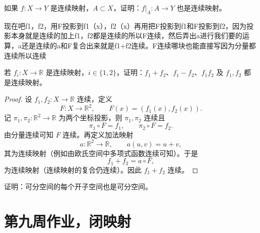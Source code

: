 \begin{homework}[14]
如果 $f:X\to Y$ 是连续映射，$A\subset X$，证明：$f|_A:A\to Y$ 也是连续映射。
\end{homework}
\begin{dxtips}
 现在吧f1，f2，用F投影到f1（x），f2（x）再用把F投影到f1和F投影到f2，因为投影本身就是连续的加上f1，f2都是连续的所以F连续，然后弄出a进行我们要的运算，a还是连续的a和F复合出来就是f1+f2连续。F连续哪块也能直接写因为分量都连续所以连续
\end{dxtips}
\begin{homework}[3.2]
若 $f_i:X\to\mathbb{R}$ 是连续映射，$i\in\{1,2\}$，证明：$f_1+f_2$、$f_1-f_2$、$f_1f_2$ 及 $f_1,f_2$ 都是连续映射。
\end{homework}
\begin{proof}
设 $f_1,f_2:X\to\mathbb{R}$ 连续，定义
\[
F:X\to\mathbb{R}^2,\qquad F(x)=(f_1(x),f_2(x)).
\]
记 $\pi_1,\pi_2:\mathbb{R}^2\to\mathbb{R}$ 为两个坐标投影，则 $\pi_1,\pi_2$ 连续且
\[
\pi_1\circ F=f_1,\qquad \pi_2\circ F=f_2.
\]
由分量连续可知 $F$ 连续。再定义加法映射
\[
a:\mathbb{R}^2\to\mathbb{R},\qquad a(u,v)=u+v,
\]
其为连续映射（例如由欧氏空间中多项式函数连续可知）。于是
\[
f_1+f_2=a\circ F,
\]
为连续映射（连续映射的复合仍连续）。因此 $f_1+f_2$ 连续。
\end{proof}
\begin{homework}[2.1]
证明：可分空间的每个开子空间也是可分空间。
\end{homework}

\section{第九周作业，闭映射}

